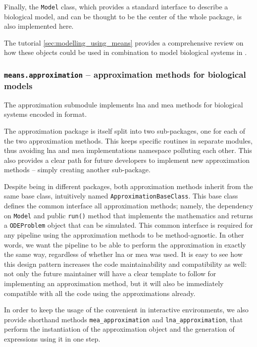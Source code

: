 Finally, the \verb"Model" class, which provides a standard interface to describe a biological model, and can be thought to be the center of the whole package, is also implemented here.

The tutorial \autoref{sec:modelling_using_means} provides a comprehensive review on how these objects could be used in combination to model biological systems in \means{}.

\subsubsection{{\tt means.approximation} -- approximation methods for biological models}

The approximation submodule implements \gls{lna} and \gls{mea} methods for biological systems encoded in \means{} format.

The approximation package is itself split into two sub-packages, one for each of the two approximation methods.
This keeps specific routines in separate modules, thus avoiding \gls{lna} and \gls{mea} implementations namespace polluting each other.
This also provides a clear path for future developers to implement new approximation methods -- simply creating another sub-package.

Despite being in different packages, both approximation methods inherit from the same base class, intuitively named \verb"ApproximationBaseClass".
This base class defines the common interface all approximation methods; namely, the dependency on \verb"Model" and public \verb"run()" method that implements the mathematics and returns a \verb"ODEProblem" object that can be simulated.
This common interface is required for any pipeline using the approximation methods to be method-agnostic.
In other words, we want the pipeline to be able to perform the approximation in exactly the same way, regardless of whether \gls{lna} or \gls{mea} was used. 
It is easy to see how this design pattern increases the code maintainability and compatibility as well: not only the future maintainer will have a clear template to follow for implementing an approximation method, but it will also be immediately compatible with all the code using the approximations already.

In order to keep the usage of the \means{} convenient in interactive environments, we also provide shorthand methods \verb"mea_approximation" and \verb"lna_approximation", that perform the instantiation of the approximation object and the generation of expressions using it in one step.

